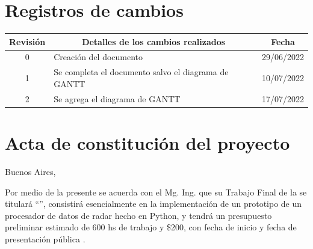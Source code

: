 \documentclass[
11pt, %
]{charter}
\begin{document}
\maketitle
\thispagestyle{empty}
\pagebreak


\thispagestyle{empty}
{\setlength{\parskip}{0pt}
\tableofcontents{}
}
\pagebreak


\section*{Registros de cambios}
\label{sec:registro}


\begin{table}[ht]
\label{tab:registro}
\centering
\begin{tabularx}{\linewidth}{@{}|c|X|c|@{}}
\hline
\rowcolor[HTML]{C0C0C0} 
Revisión & \multicolumn{1}{c|}{\cellcolor[HTML]{C0C0C0}Detalles de los cambios realizados} & Fecha \\ \hline
0        & Creación del documento                                 & 29/06/2022 \\ \hline
1        & Se completa el documento salvo el diagrama de GANTT    & 10/07/2022 \\ \hline
2        & Se agrega el diagrama de GANTT                         & 17/07/2022 \\ \hline
\end{tabularx}
\end{table}

\pagebreak



\section*{Acta de constitución del proyecto}
\label{sec:acta}

\begin{flushright}
Buenos Aires, \fechaInicioName
\end{flushright}

\vspace{2cm}

Por medio de la presente se acuerda con el Mg. Ing. \authorname\hspace{1px} que
su Trabajo Final de la \degreename\hspace{1px} se titulará ``\ttitle'',
consistirá esencialmente en la implementación de un prototipo de
  un procesador de datos de radar hecho en Python, y tendrá un presupuesto preliminar estimado de 600 hs de trabajo y \$200, con fecha de inicio \fechaInicioName\hspace{1px} y fecha de presentación pública \fechaFinalName.
\end{document}
